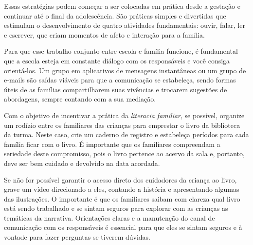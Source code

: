 \documentclass[11pt]{extarticle}
\begin{document}
Essas estratégias podem começar a ser colocadas em prática desde a 
gestação e continuar até o final da adolescência. São práticas simples e divertidas 
que estimulam o desenvolvimento de quatro atividades fundamentais: ouvir, falar, 
ler e escrever, que criam momentos de afeto e interação para a família. 


Para que esse trabalho conjunto entre escola e família funcione, é 
fundamental que a escola esteja em constante diálogo com os responsáveis e 
você consiga orientá-los. Um grupo em aplicativos de mensagens instantâneas ou um 
grupo de e-mails são saídas viáveis para que a comunicação se estabeleça, sendo formas úteis de as famílias compartilharem suas vivências e trocarem sugestões 
de abordagens, sempre contando com a sua mediação. 

Com o objetivo de incentivar 
a prática da \textit{literacia familiar}, se possível, organize um rodízio entre os familiares 
das crianças para emprestar o livro da biblioteca da turma. Neste caso, crie um caderno 
de registro e estabeleça períodos para cada família ficar com o livro. É importante 
que os familiares compreendam a seriedade deste compromisso, pois o livro pertence 
ao acervo da sala e, portanto, deve ser bem cuidado e devolvido na data acordada. 

Se não for possível garantir o acesso direto dos cuidadores da criança ao livro, 
grave um vídeo direcionado a eles, contando a história e apresentando algumas 
das ilustrações. O importante é que os familiares saibam com clareza qual livro 
está sendo trabalhado e se sintam seguros para explorar com as crianças as temáticas da narrativa. Orientações claras e a manutenção do canal de comunicação com 
os responsáveis é essencial para que eles se sintam seguros e à vontade para fazer perguntas 
se tiverem dúvidas. 
\end{document}
